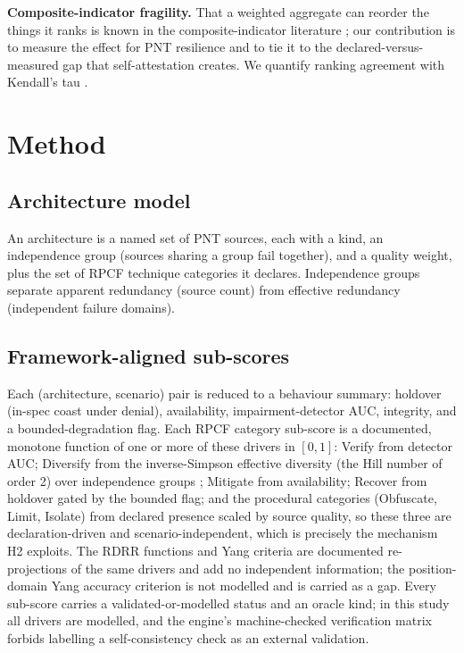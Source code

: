 \documentclass[conference]{IEEEtran}
\begin{document}
\textbf{Composite-indicator fragility.} That a weighted aggregate can reorder the things it ranks is known in the composite-indicator literature \cite{saisana,oecd}; our contribution is to measure the effect for PNT resilience and to tie it to the declared-versus-measured gap that self-attestation creates. We quantify ranking agreement with Kendall's tau \cite{kendall}.

\section{Method}
\subsection{Architecture model}
An architecture is a named set of PNT sources, each with a kind, an independence group (sources sharing a group fail together), and a quality weight, plus the set of RPCF technique categories it declares. Independence groups separate apparent redundancy (source count) from effective redundancy (independent failure domains).

\subsection{Framework-aligned sub-scores}
Each (architecture, scenario) pair is reduced to a behaviour summary: holdover (in-spec coast under denial), availability, impairment-detector AUC, integrity, and a bounded-degradation flag. Each RPCF category sub-score is a documented, monotone function of one or more of these drivers in $[0,1]$: Verify from detector AUC; Diversify from the inverse-Simpson effective diversity (the Hill number of order 2) over independence groups \cite{simpson,hill}; Mitigate from availability; Recover from holdover gated by the bounded flag; and the procedural categories (Obfuscate, Limit, Isolate) from declared presence scaled by source quality, so these three are declaration-driven and scenario-independent, which is precisely the mechanism H2 exploits. The RDRR functions and Yang criteria are documented re-projections of the same drivers and add no independent information; the position-domain Yang accuracy criterion is not modelled and is carried as a gap. Every sub-score carries a validated-or-modelled status and an oracle kind; in this study all drivers are modelled, and the engine's machine-checked verification matrix forbids labelling a self-consistency check as an external validation.
\end{document}
